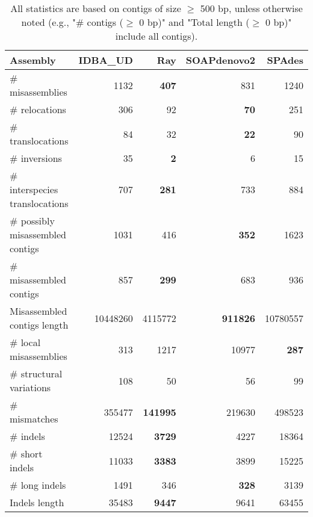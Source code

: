 \documentclass[12pt,a4paper]{article}
\begin{document}
\begin{table}[ht]
\begin{center}
\caption{All statistics are based on contigs of size $\geq$ 500 bp, unless otherwise noted (e.g., "\# contigs ($\geq$ 0 bp)" and "Total length ($\geq$ 0 bp)" include all contigs).}
\begin{tabular}{|l*{4}{|r}|}
\hline
Assembly & IDBA\_UD & Ray & SOAPdenovo2 & SPAdes \\ \hline
\# misassemblies & 1132 & {\bf 407} & 831 & 1240 \\ \hline
\hspace{5mm}\# relocations & 306 & 92 & {\bf 70} & 251 \\ \hline
\hspace{5mm}\# translocations & 84 & 32 & {\bf 22} & 90 \\ \hline
\hspace{5mm}\# inversions & 35 & {\bf 2} & 6 & 15 \\ \hline
\hspace{5mm}\# interspecies translocations & 707 & {\bf 281} & 733 & 884 \\ \hline
\# possibly misassembled contigs & 1031 & 416 & {\bf 352} & 1623 \\ \hline
\# misassembled contigs & 857 & {\bf 299} & 683 & 936 \\ \hline
Misassembled contigs length & 10448260 & 4115772 & {\bf 911826} & 10780557 \\ \hline
\# local misassemblies & 313 & 1217 & 10977 & {\bf 287} \\ \hline
\# structural variations & 108 & 50 & 56 & 99 \\ \hline
\# mismatches & 355477 & {\bf 141995} & 219630 & 498523 \\ \hline
\# indels & 12524 & {\bf 3729} & 4227 & 18364 \\ \hline
\hspace{5mm}\# short indels & 11033 & {\bf 3383} & 3899 & 15225 \\ \hline
\hspace{5mm}\# long indels & 1491 & 346 & {\bf 328} & 3139 \\ \hline
Indels length & 35483 & {\bf 9447} & 9641 & 63455 \\ \hline
\end{tabular}
\end{center}
\end{table}
\end{document}
